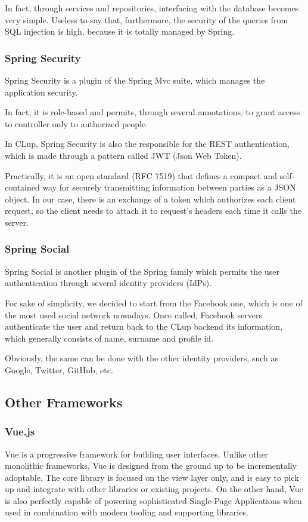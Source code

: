 \documentclass[table, 12pt]{article}
\begin{document}
In fact, through services and repositories, interfacing with the database becomes very simple. Useless to say that, furthermore, the security of the queries from SQL injection is high, because it is totally managed by Spring.

\subsubsection{Spring Security}
Spring Security is a plugin of the Spring Mvc suite, which manages the application security.

In fact, it is role-based and permits, through several annotations, to grant access to controller only to authorized people.

In CLup, Spring Security is also the responsible for the REST authentication, which is made through a pattern called JWT (Json Web Token).

Practically, it is an open standard (RFC 7519) that defines a compact and self-contained way for securely transmitting information between parties as a JSON object.
In our case, there is an exchange of a token which authorizes each client request, so the client needs to attach it to request's headers each time it calls the server.
\subsubsection{Spring Social}
Spring Social is another plugin of the Spring family which permits the user authentication through several identity providers (IdPs).

For sake of simplicity, we decided to start from the Facebook one, which is one of the most used social network nowadays. Once called, Facebook servers authenticate the user and return back to the CLup backend its information, which generally consists of name, surname and profile id.

Obviously, the same can be done with the other identity providers, such as Google, Twitter, GitHub, etc.

\subsection{Other Frameworks}
\label{client_side_frameworks}
\subsubsection{Vue.js}
Vue is a progressive framework for building user interfaces. Unlike other monolithic frameworks, Vue is designed from the ground up to be incrementally adoptable. The core library is focused on the view layer only, and is easy to pick up and integrate with other libraries or existing projects. On the other hand, Vue is also perfectly capable of powering sophisticated Single-Page Applications when used in combination with modern tooling and supporting libraries.
\end{document}
